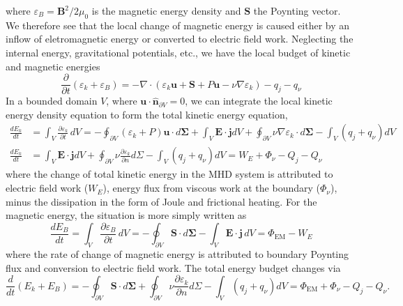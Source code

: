 %
where $\varepsilon_B = \mathbf{B}^2 / 2\mu_0$ is the magnetic energy density and $\mathbf{S}$ the Poynting vector. We therefore see that the local change of magnetic energy is caused either by an inflow of eletromagnetic energy or converted to electric field work. Neglecting the internal energy, gravitational potentials, etc., we have the local budget of kinetic and magnetic energies
%
\begin{equation}
    \frac{\partial}{\partial t}\left(\varepsilon_k + \varepsilon_B\right) = - \nabla\cdot \left(\varepsilon_k \mathbf{u} + \mathbf{S} + P \mathbf{u} - \nu \nabla \varepsilon_k\right) - q_j - q_\nu
\end{equation}
%
In a bounded domain $V$, where $\mathbf{u}\cdot \hat{\mathbf{n}}_{\partial V} = 0$, we can integrate the local kinetic energy density equation to form the total kinetic energy equation,
%
\begin{equation}
\begin{aligned}
    \frac{d E_k}{d t} &= \int_V \frac{\partial \varepsilon_k}{\partial t} \, dV = - \oint_{\partial V} (\varepsilon_k + P) \mathbf{u} \cdot d\boldsymbol{\Sigma} + \int_V \mathbf{E}\cdot \mathbf{j} dV + \oint_{\partial V} \nu \nabla \varepsilon_k \cdot d\boldsymbol{\Sigma} - \int_V (q_j + q_\nu) dV \\ 
    \frac{dE_k}{dt} &= \int_V \mathbf{E}\cdot \mathbf{j} dV + \oint_{\partial V} \nu \frac{\partial\varepsilon_k}{\partial n} d\Sigma - \int_V (q_j + q_\nu) dV = W_E + \Phi_{\nu} - Q_j - Q_\nu
\end{aligned}
\end{equation}
%
where the change of total kinetic energy in the MHD system is attributed to electric field work ($W_E$), energy flux from viscous work at the boundary ($\Phi_\nu$), minus the dissipation in the form of Joule and frictional heating. For the magnetic energy, the situation is more simply written as 
%
\begin{equation}
    \frac{d E_B}{dt} = \int_V \frac{\partial \varepsilon_B}{\partial t} \, dV = - \oint_{\partial V} \mathbf{S}\cdot d\boldsymbol{\Sigma} - \int_V \mathbf{E}\cdot \mathbf{j}\, dV = \Phi_\mathrm{EM} - W_E
\end{equation}
%
where the rate of change of magnetic energy is attributed to boundary Poynting flux and conversion to electric field work. The total energy budget changes via
%
\begin{equation}
    \frac{d}{dt}(E_k + E_B) = - \oint_{\partial V} \mathbf{S}\cdot d\boldsymbol{\Sigma} + \oint_{\partial V} \nu \frac{\partial\varepsilon_k}{\partial n} d\Sigma - \int_V (q_j + q_\nu) dV = \Phi_\mathrm{EM} + \Phi_{\nu} - Q_j - Q_\nu.
\end{equation}
%

